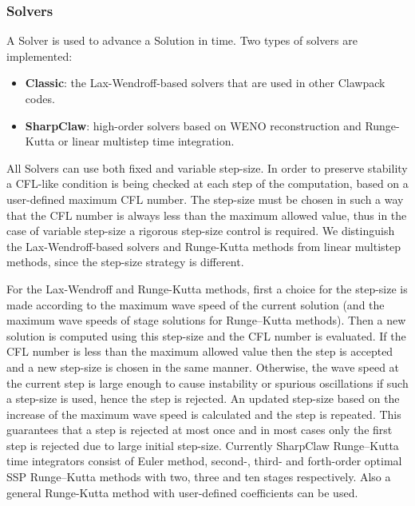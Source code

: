 \subsubsection{\pyclaw Solvers}
A Solver is used to advance a Solution in time.  Two types of solvers are implemented:
\begin{itemize}
    \item {\bf Classic}: the Lax-Wendroff-based solvers that are used in other Clawpack codes.
    \item {\bf SharpClaw}: high-order solvers based on WENO reconstruction and Runge-Kutta or linear multistep time integration.
\end{itemize}
All \pyclaw Solvers can use both fixed and variable step-size.
In order to preserve stability a CFL-like condition is being checked at each step of the computation, based on
a user-defined maximum CFL number.
The step-size must be chosen in such a way that the CFL number is always less than the maximum allowed 
value, thus in the case of variable step-size a rigorous step-size control is required.
We distinguish the Lax-Wendroff-based solvers and Runge-Kutta methods from linear multistep methods,
since the step-size strategy is different.

For the Lax-Wendroff and Runge-Kutta methods, first a choice for the step-size is made according to the 
maximum wave speed of the current solution 
(and the maximum wave speeds of stage solutions for Runge--Kutta methods).
Then a new solution is computed using this step-size and the CFL number is evaluated.
If the CFL number is less than the maximum allowed value then the step is accepted and a new step-size is 
chosen in the same manner.
Otherwise, the wave speed at the current step is large enough to cause instability or spurious oscillations if 
such a step-size is used, hence the step is rejected.
An updated step-size based on the increase of the maximum wave speed is calculated and the step is
repeated.
This guarantees that a step is rejected at most once and in most cases only the first step is rejected due to 
large initial step-size.
Currently SharpClaw Runge--Kutta time integrators consist of Euler method, second-, third- and forth-order
optimal SSP Runge--Kutta methods with two, three and ten stages respectively.
Also a general Runge-Kutta method with user-defined coefficients can be used. 

